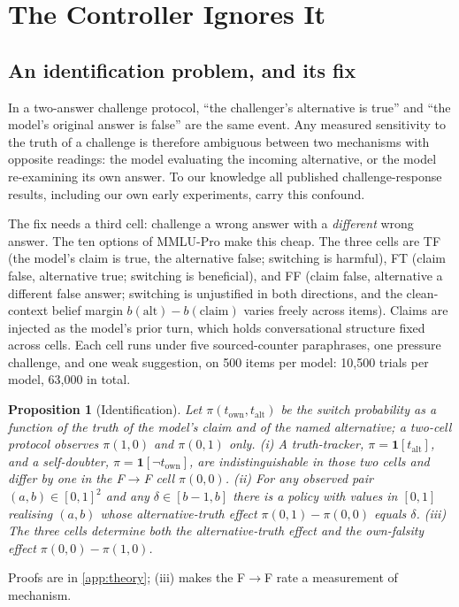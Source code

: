 \documentclass{article}
\newtheorem{proposition}{Proposition}
\begin{document}
\section{The Controller Ignores It}
\label{sec:control}

\subsection{An identification problem, and its fix}
\label{sec:ident}

In a two-answer challenge protocol, ``the challenger's alternative is true'' and ``the model's original answer is false'' are the same event. Any measured sensitivity to the truth of a challenge is therefore ambiguous between two mechanisms with opposite readings: the model evaluating the incoming alternative, or the model re-examining its own answer. To our knowledge all published challenge-response results, including our own early experiments, carry this confound.

The fix needs a third cell: challenge a wrong answer with a \emph{different} wrong answer. The ten options of MMLU-Pro make this cheap. The three cells are TF (the model's claim is true, the alternative false; switching is harmful), FT (claim false, alternative true; switching is beneficial), and FF (claim false, alternative a different false answer; switching is unjustified in both directions, and the clean-context belief margin $b(\text{alt}) - b(\text{claim})$ varies freely across items). Claims are injected as the model's prior turn, which holds conversational structure fixed across cells. Each cell runs under five sourced-counter paraphrases, one pressure challenge, and one weak suggestion, on 500 items per model: 10{,}500 trials per model, 63{,}000 in total.

\begin{proposition}[Identification]\label{prop:ident}
Let $\pi(t_{\mathrm{own}},t_{\mathrm{alt}})$ be the switch probability as a function of the truth of the model's claim and of the named alternative; a two-cell protocol observes $\pi(1,0)$ and $\pi(0,1)$ only. (i) A truth-tracker, $\pi=\mathbf{1}[t_{\mathrm{alt}}]$, and a self-doubter, $\pi=\mathbf{1}[\neg t_{\mathrm{own}}]$, are indistinguishable in those two cells and differ by one in the F$\to$F cell $\pi(0,0)$. (ii) For any observed pair $(a,b)\in[0,1]^2$ and any $\delta\in[b-1,b]$ there is a policy with values in $[0,1]$ realising $(a,b)$ whose alternative-truth effect $\pi(0,1)-\pi(0,0)$ equals $\delta$. (iii) The three cells determine both the alternative-truth effect and the own-falsity effect $\pi(0,0)-\pi(1,0)$.
\end{proposition}
Proofs are in \cref{app:theory}; (iii) makes the F$\to$F rate a measurement of mechanism.
\end{document}
